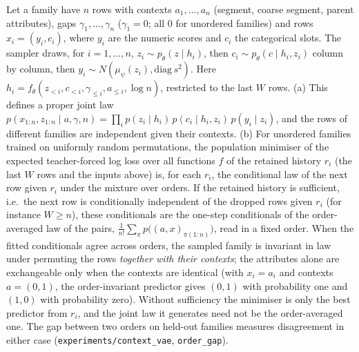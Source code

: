 \setcounter{proposition}{1859}
\begin{proposition}\label{prop:ctvaefam}
Let a family have $n$ rows with contexts $a_1,\dots,a_n$ (segment, coarse segment, parent attributes), gaps $\gamma_1,\dots,\gamma_n$ ($\gamma_1=0$; all $0$ for unordered families) and rows $x_i=(y_i,c_i)$, where $y_i$ are the numeric scores and $c_i$ the categorical slots. The sampler draws, for $i=1,\dots,n$, $z_i\sim p_\theta(z\mid h_i)$, then $c_i\sim p_\theta(c\mid h_i,z_i)$ column by column, then $y_i\sim N(\mu_\psi(z_i),\mathrm{diag}\,s^2)$. Here $h_i=f_\theta(z_{<i},c_{<i},\gamma_{\le i},a_{\le i},\log n)$, restricted to the last $W$ rows. (a) This defines a proper joint law $p(x_{1:n},z_{1:n}\mid a,\gamma,n)=\prod_i p(z_i\mid h_i)\,p(c_i\mid h_i,z_i)\,p(y_i\mid z_i)$, and the rows of different families are independent given their contexts. (b) For unordered families trained on uniformly random permutations, the population minimiser of the expected teacher-forced log loss over all functions $f$ of the retained history $r_i$ (the last $W$ rows and the inputs above) is, for each $r_i$, the conditional law of the next row given $r_i$ under the mixture over orders. If the retained history is sufficient, i.e.\ the next row is conditionally independent of the dropped rows given $r_i$ (for instance $W\ge n$), these conditionals are the one-step conditionals of the order-averaged law of the pairs, $\frac1{n!}\sum_\pi p\big((a,x)_{\pi(1:n)}\big)$, read in a fixed order. When the fitted conditionals agree across orders, the sampled family is invariant in law under permuting the rows \emph{together with their contexts}; the attributes alone are exchangeable only when the contexts are identical (with $x_i=a_i$ and contexts $a=(0,1)$, the order-invariant predictor gives $(0,1)$ with probability one and $(1,0)$ with probability zero). Without sufficiency the minimiser is only the best predictor from $r_i$, and the joint law it generates need not be the order-averaged one. The gap between two orders on held-out families measures disagreement in either case (\texttt{experiments/context\_vae}, \texttt{order\_gap}).
\end{proposition}
